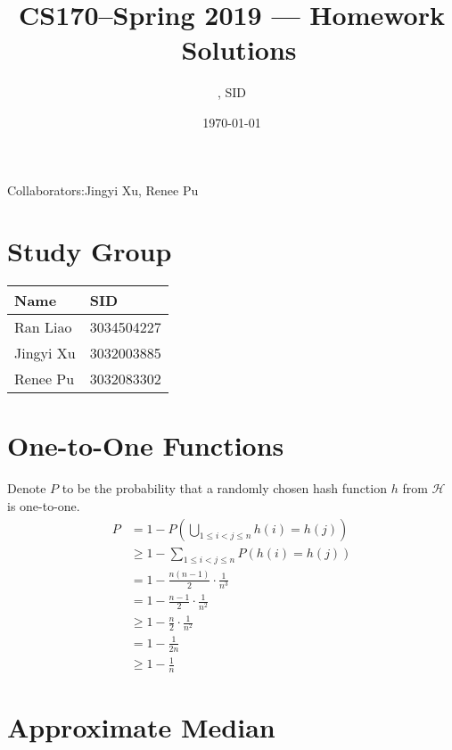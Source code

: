 \documentclass[11pt]{article}
\title{CS170--Spring 2019 --- Homework \Homework\ Solutions}
\author{\Name, SID \SID}
\date{\today}
\begin{document}
\maketitle
Collaborators:Jingyi Xu, Renee Pu

\section{Study Group}
	\begin{tabular}{ll}
		Name		&   SID         		\\\hline
		Ran Liao		&   3034504227  	\\  
		Jingyi Xu		&   3032003885  	\\
		Renee Pu		&   3032083302  	\\
	\end{tabular}

	
\newpage
\section{One-to-One Functions}

	Denote $P$ to be the probability that a randomly chosen hash function $h$ from $\mathcal{H}$ is one-to-one. 
	\begin{align*}
		P
		&= 
		1 - P(\bigcup_{1 \le i < j \le n} h(i) = h(j))\\
		&\ge
		1 - \sum_{1 \le i < j \le n} P(h(i) = h(j))\\
		&=
		1 - \frac{n(n-1)}{2} \cdot \frac{1}{n^3} \\
		&=
		1 - \frac{n-1}{2} \cdot \frac{1}{n^2} \\
		&\ge
		1 - \frac{n}{2} \cdot \frac{1}{n^2} \\
		&=
		1 -  \frac{1}{2n} \\
		&\ge
		1 - \frac{1}{n}
	\end{align*}
	


\newpage
\section{Approximate Median}
\end{document}
